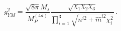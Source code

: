 \begin{equation}
g_{YM}^2 = \frac{\sqrt{8 \pi}M_s}{ M_P^{(4d)}}
\frac{\sqrt{\chi_1 \chi_2 \chi_3}}{ \prod_{i=1}^3 \sqrt{n^{i2} +
\hat{m}^{i2} \chi_i^2}}\, .
\end{equation}

